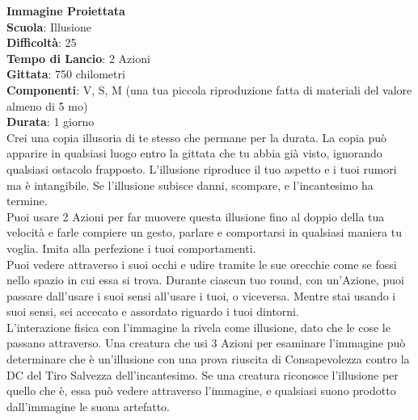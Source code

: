 \begin{multicols}{2}
\medskip\textbf{Immagine Proiettata}\\
\textbf{Scuola}: Illusione\\
\textbf{Difficoltà}:  25\\
\textbf{Tempo di Lancio}: 2 Azioni\\
\textbf{Gittata}: 750 chilometri\\
\textbf{Componenti}: V, S, M (una tua piccola riproduzione fatta di materiali del valore almeno di 5 mo)\\
\textbf{Durata}: 1 giorno\\
Crei una copia illusoria di te stesso che permane per la durata. La copia può apparire in qualsiasi luogo entro la gittata che tu abbia già visto, ignorando qualsiasi ostacolo frapposto. L’illusione riproduce il tuo aspetto e i tuoi rumori ma è intangibile. Se l’illusione subisce danni, scompare, e l'incantesimo ha termine.\\
Puoi usare 2 Azioni per far muovere questa illusione fino al doppio della tua velocità e farle compiere un gesto, parlare e comportarsi in qualsiasi maniera tu voglia. Imita alla perfezione i tuoi comportamenti.\\
Puoi vedere attraverso i suoi occhi e udire tramite le sue orecchie come se fossi nello spazio in cui essa si trova. Durante ciascun tuo round, con un'Azione, puoi passare dall'usare i suoi sensi all'usare i tuoi, o viceversa. Mentre stai usando i suoi sensi, sei accecato e assordato riguardo i tuoi dintorni.\\
L’interazione fisica con l’immagine la rivela come illusione, dato che le cose le passano attraverso. Una creatura che usi 3 Azioni per esaminare l’immagine può determinare che è un'illusione con una prova riuscita di Consapevolezza contro la DC del Tiro Salvezza dell'incantesimo. Se una creatura riconosce l’illusione per quello che è, essa può vedere attraverso l’immagine, e qualsiasi suono prodotto dall'immagine le suona artefatto.


\end{multicols}
